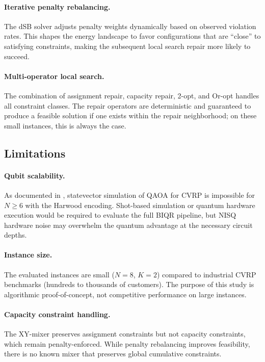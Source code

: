 \documentclass[11pt,a4paper]{article}
\theoremstyle{definition}
\begin{document}
\paragraph{Iterative penalty rebalancing.} The dSB solver adjusts penalty weights dynamically based on observed violation rates. This shapes the energy landscape to favor configurations that are ``close'' to satisfying constraints, making the subsequent local search repair more likely to succeed.

\paragraph{Multi-operator local search.} The combination of assignment repair, capacity repair, 2-opt, and Or-opt handles all constraint classes. The repair operators are deterministic and guaranteed to produce a feasible solution if one exists within the repair neighborhood; on these small instances, this is always the case.

\subsection{Limitations}

\paragraph{Qubit scalability.} As documented in , statevector simulation of QAOA for CVRP is impossible for $N \geq 6$ with the Harwood encoding. Shot-based simulation or quantum hardware execution would be required to evaluate the full BIQR pipeline, but NISQ hardware noise may overwhelm the quantum advantage at the necessary circuit depths.

\paragraph{Instance size.} The evaluated instances are small ($N=8$, $K=2$) compared to industrial CVRP benchmarks (hundreds to thousands of customers). The purpose of this study is algorithmic proof-of-concept, not competitive performance on large instances.

\paragraph{Capacity constraint handling.} The XY-mixer preserves assignment constraints but not capacity constraints, which remain penalty-enforced. While penalty rebalancing improves feasibility, there is no known mixer that preserves global cumulative constraints.
\end{document}
